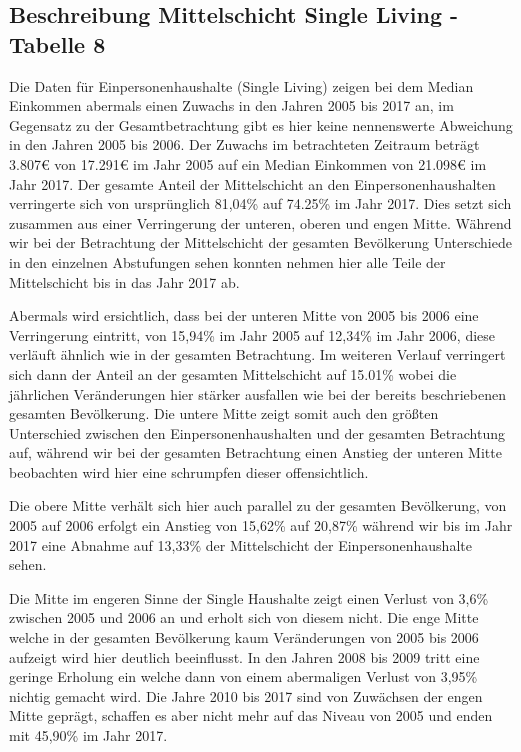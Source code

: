 \documentclass[12pt,]{article}
\newcommand{\euro}{€}
\begin{document}
\subsection{Beschreibung Mittelschicht Single Living - Tabelle
8}\label{beschreibung-mittelschicht-single-living---tabelle-8}

Die Daten für Einpersonenhaushalte (Single Living) zeigen bei dem Median
Einkommen abermals einen Zuwachs in den Jahren 2005 bis 2017 an, im
Gegensatz zu der Gesamtbetrachtung gibt es hier keine nennenswerte
Abweichung in den Jahren 2005 bis 2006. Der Zuwachs im betrachteten
Zeitraum beträgt 3.807\euro{} von 17.291\euro{} im Jahr 2005 auf ein
Median Einkommen von 21.098\euro{} im Jahr 2017. Der gesamte Anteil der
Mittelschicht an den Einpersonenhaushalten verringerte sich von
ursprünglich 81,04\% auf 74.25\% im Jahr 2017. Dies setzt sich zusammen
aus einer Verringerung der unteren, oberen und engen Mitte. Während wir
bei der Betrachtung der Mittelschicht der gesamten Bevölkerung
Unterschiede in den einzelnen Abstufungen sehen konnten nehmen hier alle
Teile der Mittelschicht bis in das Jahr 2017 ab.

Abermals wird ersichtlich, dass bei der unteren Mitte von 2005 bis 2006
eine Verringerung eintritt, von 15,94\% im Jahr 2005 auf 12,34\% im Jahr
2006, diese verläuft ähnlich wie in der gesamten Betrachtung. Im
weiteren Verlauf verringert sich dann der Anteil an der gesamten
Mittelschicht auf 15.01\% wobei die jährlichen Veränderungen hier
stärker ausfallen wie bei der bereits beschriebenen gesamten
Bevölkerung. Die untere Mitte zeigt somit auch den größten Unterschied
zwischen den Einpersonenhaushalten und der gesamten Betrachtung auf,
während wir bei der gesamten Betrachtung einen Anstieg der unteren Mitte
beobachten wird hier eine schrumpfen dieser offensichtlich.

Die obere Mitte verhält sich hier auch parallel zu der gesamten
Bevölkerung, von 2005 auf 2006 erfolgt ein Anstieg von 15,62\% auf
20,87\% während wir bis im Jahr 2017 eine Abnahme auf 13,33\% der
Mittelschicht der Einpersonenhaushalte sehen.

Die Mitte im engeren Sinne der Single Haushalte zeigt einen Verlust von
3,6\% zwischen 2005 und 2006 an und erholt sich von diesem nicht. Die
enge Mitte welche in der gesamten Bevölkerung kaum Veränderungen von
2005 bis 2006 aufzeigt wird hier deutlich beeinflusst. In den Jahren
2008 bis 2009 tritt eine geringe Erholung ein welche dann von einem
abermaligen Verlust von 3,95\% nichtig gemacht wird. Die Jahre 2010 bis
2017 sind von Zuwächsen der engen Mitte geprägt, schaffen es aber nicht
mehr auf das Niveau von 2005 und enden mit 45,90\% im Jahr 2017.
\end{document}
